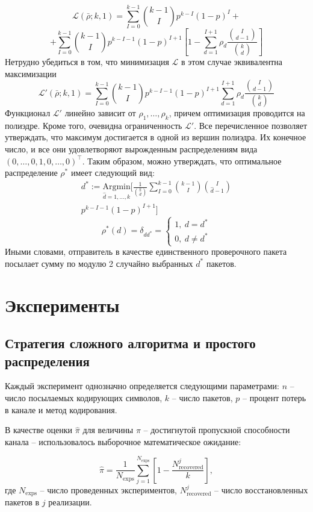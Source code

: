\[\mathcal L(\bar\rho; k, 1) = \sum_{I=0}^{k-1}\binom{k-1}{I}
p^{k-I}(1-p)^I +\]
\[+ \sum_{I=0}^{k-1}\binom{k-1}{I}
p^{k-I-1}(1-p)^{I+1}
\left[
    1 - \sum_{d=1}^{I + 1}\rho_d\frac{\binom{I}{d-1}}{\binom{k}{d}}
\right]
\]
Нетрудно убедиться в том, что минимизация $\mathcal L$ в этом случае эквивалентна
максимизации 
\[\mathcal L'(\bar\rho; k, 1) = \sum_{I=0}^{k-1}\binom{k-1}{I}p^{k-I-1}(1-p)^{I+1}\sum_{d=1}^{I+1}\rho_d\frac{\binom{I}{d-1}}{\binom{k}{d}}\]
Функционал $\mathcal L'$ линейно зависит от $\rho_1,\dots,\rho_k$,
причем оптимизация проводится на полиэдре. Кроме того, очевидна ограниченность
$\mathcal L'$. Все перечисленное позволяет утверждать, что максимум достигается
в одной из вершин полиэдра. Их конечное число, и все они удовлетворяют
вырожденным распределениям вида
$(0,\dots,0,1,0,\dots,0)^\top$. Таким образом, можно утверждать, что оптимальное
распределение $\rho^*$ имеет следующий вид:
\begin{multline*}
d^* := \underset{\hat d = 1,\dots,k}{\mathrm{Argmin}} 
    \bigg[\frac{1}{\binom{k}{\hat d}}\sum_{I=0}^{k-1}\binom{k-1}{I}\binom{I}{\hat d - 1}\\
    p^{k-I-1}(1-p)^{I+1} \bigg]
\end{multline*}
\[\rho^*(d) = 
    \delta_{dd^*}=
\left\{
\begin{aligned}
    1, \: d = d^* \\
    0, \: d \ne d^*
\end{aligned}\right.\]
Иными словами, отправитель в качестве единственного проверочного пакета посылает
сумму по модулю 2 случайно выбранных $d^*$ пакетов.

\section{Эксперименты}

\subsection{Стратегия сложного алгоритма и простого распределения}

Каждый эксперимент однозначно определяется следующими параметрами: $n$ -- число посылаемых кодирующих символов, $k$ -- число пакетов,
$p$ -- процент потерь в канале и метод кодирования.

В качестве оценки $\hat\pi$ для величины $\pi$ -- достигнутой пропускной способности канала --  использовалось выборочное математическое ожидание:

\[
    \hat\pi = \frac{1}{N_{\mathrm{exps}}}\sum_{j=1}^{N_{\mathrm{exps}}}
    \left[ 1-
    \frac{N^j_{\mathrm{recovered}}}{k} \right],
\]
где $N_{\mathrm{exps}}$ -- число проведенных экспериментов,
$N_{\mathrm{recovered}}^j$ -- число восстановленных пакетов в $j$ реализации.


